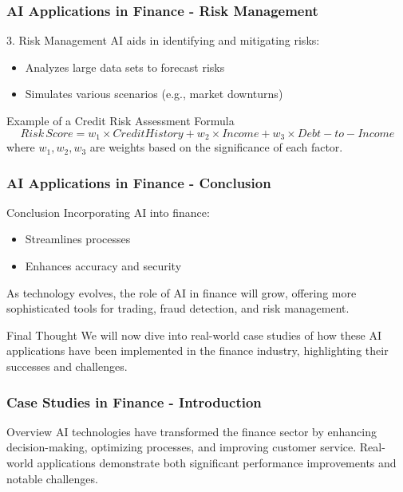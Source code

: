 \documentclass[aspectratio=169]{beamer}
\begin{document}
\begin{frame}[fragile]
    \frametitle{AI Applications in Finance - Risk Management}
    \begin{block}{3. Risk Management}
        AI aids in identifying and mitigating risks:
        \begin{itemize}
            \item Analyzes large data sets to forecast risks
            \item Simulates various scenarios (e.g., market downturns)
        \end{itemize}
        \begin{block}{Example of a Credit Risk Assessment Formula}
            \begin{equation}
                Risk \, Score = w_1 \times CreditHistory + w_2 \times Income + w_3 \times Debt-to-Income
            \end{equation}
            where $w_1, w_2, w_3$ are weights based on the significance of each factor.
        \end{block}
    \end{block}
\end{frame}

\begin{frame}[fragile]
    \frametitle{AI Applications in Finance - Conclusion}
    \begin{block}{Conclusion}
        Incorporating AI into finance:
        \begin{itemize}
            \item Streamlines processes
            \item Enhances accuracy and security
        \end{itemize}
        As technology evolves, the role of AI in finance will grow, offering more sophisticated tools for trading, fraud detection, and risk management.
    \end{block}
    \begin{block}{Final Thought}
        We will now dive into real-world case studies of how these AI applications have been implemented in the finance industry, highlighting their successes and challenges.
    \end{block}
\end{frame}

\begin{frame}[fragile]
    \frametitle{Case Studies in Finance - Introduction}
    \begin{block}{Overview}
        AI technologies have transformed the finance sector by enhancing decision-making, optimizing processes, and improving customer service. 
        Real-world applications demonstrate both significant performance improvements and notable challenges.
    \end{block}
\end{frame}
\end{document}
